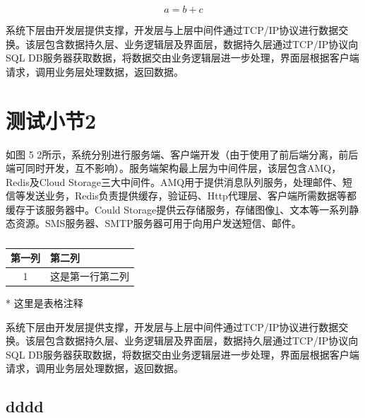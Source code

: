 \documentclass[oneside]{jufethesis}
\begin{document}
\begin{equation} 
  a = b + c
  \label{eq_1}
\end{equation} 

系统下层由开发层提供支撑，开发层与上层中间件通过TCP/IP协议进行数据交换。该层包含数据持久层、业务逻辑层及界面层，数据持久层通过TCP/IP协议向SQL DB服务器获取数据，将数据交由业务逻辑层进一步处理，界面层根据客户端请求，调用业务层处理数据，返回数据。
 
\section[小节2]{测试小节2}
如图 5 2所示，系统分别进行服务端、客户端开发（由于使用了前后端分离，前后端可同时开发，互不影响）。服务端架构最上层为中间件层，该层包含AMQ，Redis及Cloud Storage三大中间件。AMQ用于提供消息队列服务，处理邮件、短信等发送业务，Redis负责提供缓存，验证码、Http代理层、客户端所需数据等都缓存于该服务器中。Could Storage提供云存储服务，存储图像\ref{table_test}、文本等一系列静态资源。SMS服务器、SMTP服务器可用于向用户发送短信、邮件。

\begin{table}
  \tabspace %
  \centering
  \small
  \caption{}
  \begin{threeparttable}
    \begin{tabular}{cp{8cm}<{\centering}}
      \toprule
      \textbf{第一列} & \textbf{第二列} \\
      \midrule
      1 & 这是第一行第二列 \\
      \bottomrule
    \end{tabular}
    \begin{tablenotes}
      \footnotesize
      \item[*] 这里是表格注释
    \end{tablenotes}
  \end{threeparttable}
  \label{table_test}
\end{table}

系统下层由开发层提供支撑，开发层与上层中间件通过TCP/IP协议进行数据交换。该层包含数据持久层、业务逻辑层及界面层，数据持久层通过TCP/IP协议向SQL DB服务器获取数据，将数据交由业务逻辑层进一步处理，界面层根据客户端请求，调用业务层处理数据，返回数据。

\subsection{dddd}
\end{document}
